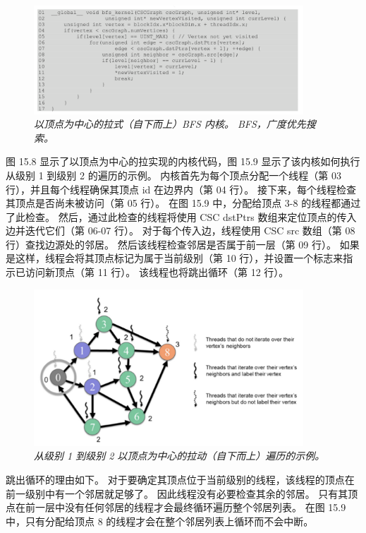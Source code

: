 \begin{figure}[H]
	\centering
	\includegraphics[width=0.9\textwidth]{figs/F15.8.png}
	\caption{\textit{以顶点为中心的拉式（自下而上）BFS 内核。 BFS，广度优先搜索。}}
\end{figure}

图 15.8 显示了以顶点为中心的拉实现的内核代码，图 15.9 显示了该内核如何执行从级别 1 到级别 2 的遍历的示例。 
内核首先为每个顶点分配一个线程（第 03 行），并且每个线程确保其顶点 id 在边界内（第 04 行）。 
接下来，每个线程检查其顶点是否尚未被访问（第 05 行）。 在图 15.9 中，分配给顶点 3-8 的线程都通过了此检查。 
然后，通过此检查的线程将使用 CSC dstPtrs 数组来定位顶点的传入边并迭代它们（第 06-07 行）。 
对于每个传入边，线程使用 CSC src 数组（第 08 行）查找边源处的邻居。 然后该线程检查邻居是否属于前一层（第 09 行）。 
如果是这样，线程会将其顶点标记为属于当前级别（第 10 行），并设置一个标志来指示已访问新顶点（第 11 行）。 
该线程也将跳出循环（第 12 行）。

\begin{figure}[H]
	\centering
	\includegraphics[width=0.9\textwidth]{figs/F15.9.png}
	\caption{\textit{从级别 1 到级别 2 以顶点为中心的拉动（自下而上）遍历的示例。}}
\end{figure}

跳出循环的理由如下。 对于要确定其顶点位于当前级别的线程，该线程的顶点在前一级别中有一个邻居就足够了。 
因此线程没有必要检查其余的邻居。 只有其顶点在前一层中没有任何邻居的线程才会最终循环遍历整个邻居列表。 
在图 15.9 中，只有分配给顶点 8 的线程才会在整个邻居列表上循环而不会中断。


